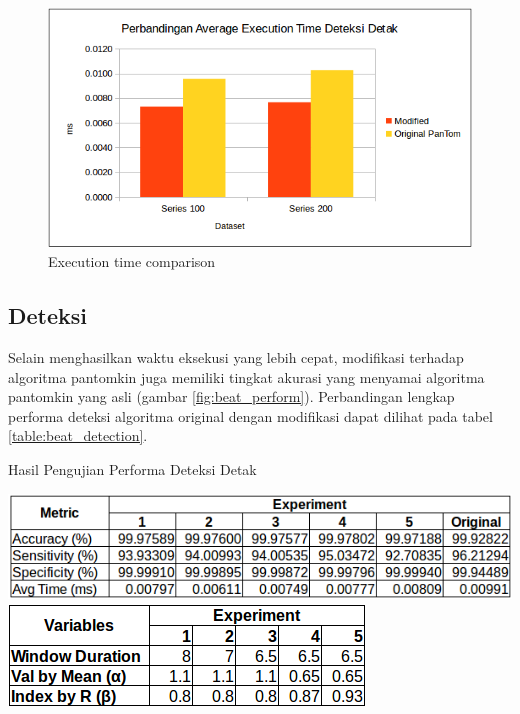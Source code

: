 \documentclass[]{indojc}
\begin{document}
\begin{figure}[htbp]
\centerline{\includegraphics[scale=0.41]{images/beat_exec.png}}
\caption{Execution time comparison}
\label{fig:exec_time}
\end{figure}

\subsection{Deteksi}
Selain menghasilkan waktu eksekusi yang lebih cepat, modifikasi terhadap algoritma pantomkin juga memiliki tingkat akurasi yang menyamai algoritma pantomkin yang asli (gambar \ref{fig:beat_perform}). Perbandingan lengkap performa deteksi algoritma original dengan modifikasi dapat dilihat pada tabel \ref{table:beat_detection}.

\begin{table}[H]
	\begin{center}
	\caption{Hasil Pengujian Performa Deteksi Detak}
	\includegraphics[scale=0.6]{images/beat_detection.png}	
	\includegraphics[scale=0.5]{images/experiment_variable.png}		
	\label{table:beat_detection}
	\end{center}
\end{table}
\end{document}
